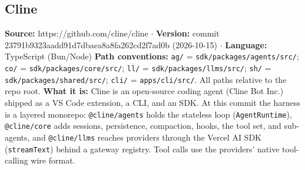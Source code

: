\subsection{Cline}

\textbf{Source:} https://github.com/cline/cline $\cdot$ \textbf{Version:} commit 23791b9323aadd91d7dbaea8a8fa262cd2f7ad0b (2026-10-15) $\cdot$ \textbf{Language:} TypeScript (Bun/Node)
\textbf{Path conventions:} \texttt{ag/\allowbreak{}} = \texttt{sdk/\allowbreak{}packages/\allowbreak{}agents/\allowbreak{}src/\allowbreak{}}; \texttt{co/\allowbreak{}} = \texttt{sdk/\allowbreak{}packages/\allowbreak{}core/\allowbreak{}src/\allowbreak{}}; \texttt{ll/\allowbreak{}} = \texttt{sdk/\allowbreak{}packages/\allowbreak{}llms/\allowbreak{}src/\allowbreak{}}; \texttt{sh/\allowbreak{}} = \texttt{sdk/\allowbreak{}packages/\allowbreak{}shared/\allowbreak{}src/\allowbreak{}}; \texttt{cli/\allowbreak{}} = \texttt{apps/\allowbreak{}cli/\allowbreak{}src/\allowbreak{}}. All paths relative to the repo root.
\textbf{What it is:} Cline is an open-source coding agent (Cline Bot Inc.) shipped as a VS Code extension, a CLI, and an SDK. At this commit the harness is a layered monorepo: \texttt{@cline/\allowbreak{}agents} holds the stateless loop (\texttt{AgentRuntime}), \texttt{@cline/\allowbreak{}core} adds sessions, persistence, compaction, hooks, the tool set, and sub-agents, and \texttt{@cline/\allowbreak{}llms} reaches providers through the Vercel AI SDK (\texttt{streamText}) behind a gateway registry. Tool calls use the providers' native tool-calling wire format.

